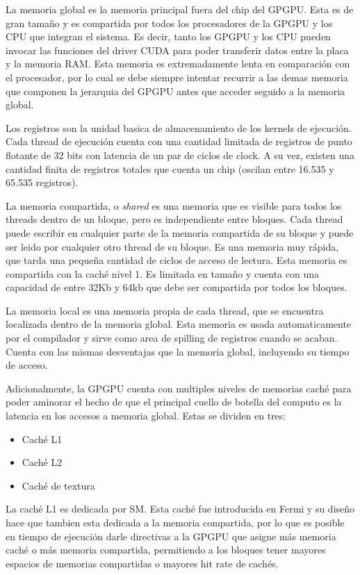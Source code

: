 La memoria global es la memoria principal fuera del chip del GPGPU. Esta es de gran tama\~no
y es compartida por todos los procesadores de la GPGPU y los CPU que integran el
sistema. Es decir, tanto los GPGPU y los CPU pueden invocar las funciones del driver CUDA
para poder transferir datos entre la placa y la memoria RAM. Esta memoria es extremadamente
lenta en comparaci\'on con el procesador, por lo cual se debe siempre intentar recurrir
a las demas memoria que componen la jerarquia del GPGPU antes que acceder seguido a la memoria
global.

Los registros son la unidad basica de almacenamiento de los kernels de ejecuci\'on.
Cada thread de ejecuci\'on cuenta con una cantidad limitada de registros de punto flotante de
32 bits con latencia de un par de ciclos de clock. A su vez, existen una cantidad finita de
registros totales que cuenta un chip (oscilan entre 16.535 y 65.535 registros).

La memoria compartida, o \textit{shared} es una memoria que es visible para todos los threads dentro
de un bloque, pero es independiente entre bloques. Cada thread puede escribir en cualquier
parte de la memoria compartida de su bloque y puede ser leido por cualquier otro thread
de su bloque. Es una memoria muy r\'apida, que tarda una peque\~na cantidad de ciclos
de acceso de lectura. Esta memoria es compartida con la cach\'e nivel 1. Es limitada en
tama\~no y cuenta con una capacidad de entre 32Kb y 64kb que debe ser compartida por todos los bloques.

La memoria local es una memoria propia de cada thread, que se encuentra localizada dentro de la
memoria global. Esta memoria es usada automaticamente por el compilador y sirve como area de spilling
de registros cuando se acaban. Cuenta con las mismas desventajas que la memoria global, incluyendo
su tiempo de acceso.

Adicionalmente, la GPGPU cuenta con multiples niveles de memorias cach\'e para poder aminorar el hecho
de que el principal cuello de botella del computo es la latencia en los accesos a memoria global.
Estas se dividen en tres:

\begin{itemize}
  \item Cach\'e L1
  \item Cach\'e L2
  \item Cach\'e de textura
\end{itemize}

La cach\'e L1 es dedicada por SM. Esta cach\'e fue introducida en Fermi y su dise\~no hace que
tambien esta dedicada a la memoria compartida, por lo que es posible en tiempo de ejecuci\'on
darle directivas a la GPGPU que asigne m\'as memoria cach\'e o m\'as memoria compartida,
permitiendo a los bloques tener mayores espacios de memorias compartidas o mayores hit rate de cach\'es.

